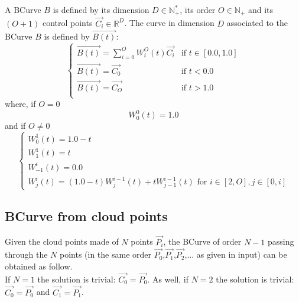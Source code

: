 A BCurve $B$ is defined by its dimension $D\in\mathbb{N}^*_+$, its order $O\in\mathbb{N_+}$ and its $(O+1)$ control points $\overrightarrow{C_i}\in\mathbb{R}^D$. The curve in dimension $D$ associated to the BCurve $B$ is defined by $\overrightarrow{B(t)}$:\\
\begin{equation}
\left\lbrace
\begin{array}{ll}
\overrightarrow{B(t)}=\sum_{i=0}^OW^O_i(t)\overrightarrow{C_i}&\textrm{if }t\in[0.0,1.0]\\
\overrightarrow{B(t)}=\overrightarrow{C_0}&\textrm{if }t<0.0\\
\overrightarrow{B(t)}=\overrightarrow{C_{O}}&\textrm{if }t>1.0\\
\end{array}
\right.
\end{equation}
where, if $O=0$\\
\begin{equation}
W^0_0(t)=1.0
\end{equation}
and if $O\neq 0$\\
\begin{equation}
\left\lbrace
\begin{array}{l}
W^1_0(t)=1.0-t\\
W^1_1(t)=t\\
W^i_{-1}(t)=0.0\\
W^i_j(t)=(1.0-t)W^{i-1}_j(t)+tW^{i-1}_{j-1}(t)\textrm{ for }i\in[2,O],j\in[0,i]
\end{array}
\right.
\end{equation}

\subsection{BCurve from cloud points}

Given the cloud points made of $N$ points $\overrightarrow{P_i}$, the BCurve of order $N-1$ passing through the $N$ points (in the same order $\overrightarrow{P_0}$,$\overrightarrow{P_1}$,$\overrightarrow{P_2}$,... as given in input) can be obtained as follow.\\

If $N=1$ the solution is trivial: $\overrightarrow{C_0}=\overrightarrow{P_0}$. As well, if $N=2$ the solution is trivial: $\overrightarrow{C_0}=\overrightarrow{P_0}$ and $\overrightarrow{C_1}=\overrightarrow{P_1}$.\\

